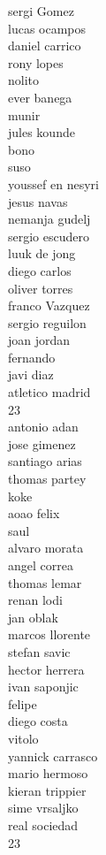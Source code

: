 \documentclass[]{article}
\begin{document}
{sergi Gomez\\
lucas ocampos\\
daniel carrico\\
rony lopes\\
nolito\\
ever banega\\
munir\\
jules kounde\\
bono\\
suso\\
youssef en nesyri\\
jesus navas\\
nemanja gudelj\\
sergio escudero\\
luuk de jong\\
diego carlos\\
oliver torres\\
franco Vazquez\\
sergio reguilon\\
joan jordan\\
fernando\\
javi diaz\\
atletico madrid\\
23\\
antonio adan\\
jose gimenez\\
santiago arias\\
thomas partey\\
koke\\
aoao felix\\
saul\\
alvaro morata\\
angel correa\\
thomas lemar\\
renan lodi\\
jan oblak\\
marcos llorente\\
stefan savic\\
hector herrera\\
ivan saponjic\\
felipe\\
diego costa\\
vitolo\\
yannick carrasco\\
mario hermoso\\
kieran trippier\\
sime vrsaljko\\
real sociedad\\
23\\
}
\end{document}

